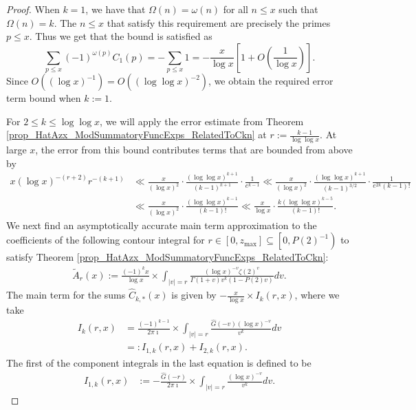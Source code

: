 \documentclass[11pt,reqno,a4letter]{article}
\numberwithin{figure}{section}
\numberwithin{table}{section}
\theoremstyle{plain}
\numberwithin{theorem}{section}
\theoremstyle{definition}
\begin{document}
\begin{proof} 
When $k = 1$, we have that $\Omega(n) = \omega(n)$ for all $n \leq x$ such that $\Omega(n) = k$. 
The $n \leq x$ that satisfy this requirement are precisely the primes $p \leq x$. 
Thus we get that the bound is satisfied as 
\[
\sum_{p \leq x} (-1)^{\omega(p)} C_1(p) = -\sum_{p \leq x} 1 = 
     - \frac{x}{\log x} \left[1 + O\left(\frac{1}{\log x}\right)\right]. 
\]
Since $O((\log x)^{-1}) = O((\log\log x)^{-2})$, we obtain the required error term 
bound when $k := 1$. 

For $2 \leq k \leq \log\log x$, we will apply the error estimate from 
Theorem \ref{prop_HatAzx_ModSummatoryFuncExps_RelatedToCkn} at 
$r := \frac{k-1}{\log\log x}$. 
At large $x$, the error from this bound contributes terms that are bounded from above by 
\begin{align*} 
x (\log x)^{-(r+2)} r^{-(k+1)} & \ll \frac{x}{(\log x)^2} \cdot 
     \frac{(\log\log x)^{k+1}}{(k-1)^{k+1}} \cdot \frac{1}{e^{k-1}} 
     \ll \frac{x}{(\log x)^2} \cdot \frac{(\log\log x)^{k+1}}{(k-1)^{3/2}} \cdot 
     \frac{1}{e^{2k} (k-1)!} \\ 
     & \ll \frac{x}{(\log x)^2} \cdot \frac{(\log\log x)^{k-1}}{(k-1)!} \ll 
     \frac{x}{\log x} \cdot \frac{k (\log\log x)^{k-5}}{(k-1)!}. 
\end{align*} 
We next find an asymptotically accurate main term approximation to the coefficients 
of the following contour integral for $r \in [0, z_{\max}] \subseteq \left[0, P(2)^{-1}\right)$ 
to satisfy Theorem \ref{prop_HatAzx_ModSummatoryFuncExps_RelatedToCkn}: 
\begin{align} 
\label{eqn_WideTildeArx_CountourIntDef_v1} 
\widetilde{A}_r(x) := 
     \frac{(-1)^k x}{\log x} 
     \times \int_{|v|=r} \frac{(\log x)^{-v} \zeta(2)^{v}}{\Gamma(1+v) 
     v^{k} (1 - P(2) v)} dv. 
\end{align} 
The main term for the sums $\widehat{C}_{k,\ast}(x)$ 
is given by $-\frac{x}{\log x} \times I_k(r, x)$, where we take 
\begin{align*}
I_k(r, x) & = \frac{(-1)^{k-1}}{2\pi\imath} \times \int_{|v|=r} 
     \frac{\widehat{G}(-v) (\log x)^{-v}}{v^k} dv \\ 
     & =: I_{1,k}(r, x) + I_{2,k}(r, x). 
\end{align*}
The first of the component integrals in the last equation is defined to be 
\begin{align*}
I_{1,k}(r, x) & := -\frac{\widehat{G}(-r)}{2\pi\imath} \times \int_{|v|=r} 
     \frac{(\log x)^{-v}}{v^k} dv. 

\end{align*}
\end{proof}
\end{document}
